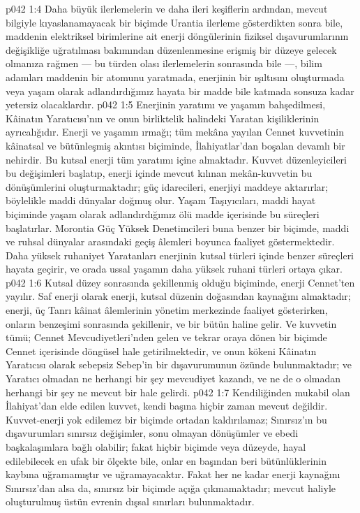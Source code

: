 \vs p042 1:4 Daha büyük ilerlemelerin ve daha ileri keşiflerin ardından, mevcut bilgiyle kıyaslanamayacak bir biçimde Urantia ilerleme gösterdikten sonra bile, maddenin elektriksel birimlerine ait enerji döngülerinin fiziksel dışavurumlarının değişikliğe uğratılması bakımından düzenlenmesine erişmiş bir düzeye gelecek olmanıza rağmen --- bu türden olası ilerlemelerin sonrasında bile ---, bilim adamları maddenin bir atomunu yaratmada, enerjinin bir ışıltısını oluşturmada veya yaşam olarak adlandırdığımız hayata bir madde bile katmada sonsuza kadar yetersiz olacaklardır.
\vs p042 1:5 Enerjinin yaratımı ve yaşamın bahşedilmesi, Kâinatın Yaratıcısı’nın ve onun birliktelik halindeki Yaratan kişiliklerinin ayrıcalığıdır. Enerji ve yaşamın ırmağı; tüm mekâna yayılan Cennet kuvvetinin kâinatsal ve bütünleşmiş akıntısı biçiminde, İlahiyatlar’dan boşalan devamlı bir nehirdir. Bu kutsal enerji tüm yaratımı içine almaktadır. Kuvvet düzenleyicileri bu değişimleri başlatıp, enerji içinde mevcut kılınan mekân\hyp{}kuvvetin bu dönüşümlerini oluşturmaktadır; güç idarecileri, enerjiyi maddeye aktarırlar; böylelikle maddi dünyalar doğmuş olur. Yaşam Taşıyıcıları, maddi hayat biçiminde yaşam olarak adlandırdığımız ölü madde içerisinde bu süreçleri başlatırlar. Morontia Güç Yüksek Denetimcileri buna benzer bir biçimde, maddi ve ruhsal dünyalar arasındaki geçiş âlemleri boyunca faaliyet göstermektedir. Daha yüksek ruhaniyet Yaratanları enerjinin kutsal türleri içinde benzer süreçleri hayata geçirir, ve orada ussal yaşamın daha yüksek ruhani türleri ortaya çıkar.
\vs p042 1:6 Kutsal düzey sonrasında şekillenmiş olduğu biçiminde, enerji Cennet’ten yayılır. Saf enerji olarak enerji, kutsal düzenin doğasından kaynağını almaktadır; enerji, üç Tanrı kâinat âlemlerinin yönetim merkezinde faaliyet gösterirken, onların benzeşimi sonrasında şekillenir, ve bir bütün haline gelir. Ve kuvvetin tümü; Cennet Mevcudiyetleri’nden gelen ve tekrar oraya dönen bir biçimde Cennet içerisinde döngüsel hale getirilmektedir, ve onun kökeni Kâinatın Yaratıcısı olarak sebepsiz Sebep’in bir dışavurumunun özünde bulunmaktadır; ve Yaratıcı olmadan ne herhangi bir şey mevcudiyet kazandı, ve ne de o olmadan herhangi bir şey ne mevcut bir hale gelirdi.
\vs p042 1:7 Kendiliğinden mukabil olan İlahiyat’dan elde edilen kuvvet, kendi başına hiçbir zaman mevcut değildir. Kuvvet\hyp{}enerji yok edilemez bir biçimde ortadan kaldırılamaz; Sınırsız’ın bu dışavurumları sınırsız değişimler, sonu olmayan dönüşümler ve ebedi başkalaşımlara bağlı olabilir; fakat hiçbir biçimde veya düzeyde, hayal edilebilecek en ufak bir ölçekte bile, onlar en başından beri bütünlüklerinin kaybına uğramamıştır ve uğramayacaktır. Fakat her ne kadar enerji kaynağını Sınırsız’dan alsa da, sınırsız bir biçimde açığa çıkmamaktadır; mevcut haliyle oluşturulmuş üstün evrenin dışsal sınırları bulunmaktadır.
